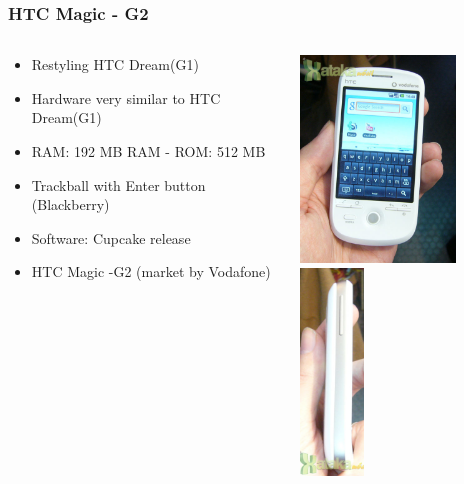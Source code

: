 \documentclass{beamer}
\begin{document}
\begin{frame}
\frametitle{HTC Magic - G2}

\begin{columns}
\begin{column}{0.5\textwidth}

\begin{itemize}
\item Restyling HTC Dream(G1)

\item Hardware very similar to HTC Dream(G1)
\item RAM: 192 MB RAM - ROM: 512 MB
\item Trackball with Enter button (Blackberry)
\item Software: Cupcake release
\item HTC Magic -G2 (market by Vodafone)
\end{itemize}
\end{column}

\begin{column}{0.5\textwidth}
\begin{center}
  \includegraphics[height=5.5cm]{figs/htc-magic}
  \includegraphics[height=5.5cm]{figs/htc-magic-2}
\end{center}
\end{column}
\end{columns}
\end{frame}
\end{document}
